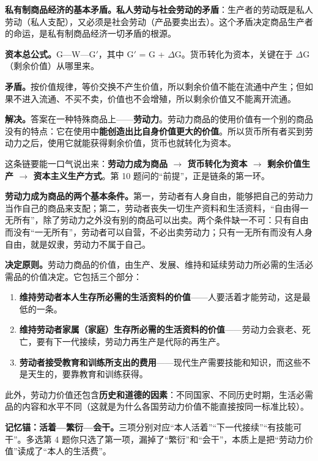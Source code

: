 \documentclass[11pt]{ctexart}
\newcommand{\dw}[1]{\textbf{\color{violetdeep}#1}}   %
\let\origsubhdr\subhdr
\renewcommand{\subhdr}[1]{\par\needspace{4\baselineskip}\origsubhdr{#1}}
\begin{document}
\textbf{私有制商品经济的基本矛盾。}\dw{私人劳动与社会劳动的矛盾}：生产者的劳动既是私人劳动（私人支配），又必须是社会劳动（产品要卖出去）。这个矛盾决定商品生产者的命运，是私有制商品经济一切矛盾的根源。


\textbf{资本总公式。}G—W—G$'$，其中 G$'$ = G + $\Delta$G。货币转化为资本，关键在于 $\Delta$G（剩余价值）从哪里来。

\textbf{矛盾。}按价值规律，等价交换不产生价值，所以剩余价值不能在流通中产生；但如果不进入流通、不买不卖，价值也不会增殖，所以剩余价值又不能离开流通。

\textbf{解决。}答案在一种特殊商品上——\dw{劳动力}。劳动力商品的使用价值有一个别的商品没有的特点：它在使用中\dw{能创造出比自身价值更大的价值}。所以货币所有者买到劳动力之后，使用它就能获得剩余价值，货币也就转化为资本。

这条链要能一口气说出来：\dw{劳动力成为商品 $\rightarrow$ 货币转化为资本 $\rightarrow$ 剩余价值生产 $\rightarrow$ 资本主义生产方式}。第 10 题问的“前提”，正是链条的第一环。

\textbf{劳动力成为商品的两个基本条件。}第一，劳动者有人身自由，能够把自己的劳动力当作自己的商品来支配；第二，劳动者丧失一切生产资料和生活资料，“自由得一无所有”，除了劳动力之外没有别的商品可以出卖。两个条件缺一不可：只有自由而没有“一无所有”，劳动者可以自营，不必出卖劳动力；只有一无所有而没有人身自由，就是奴隶，劳动力不属于自己。


\textbf{决定原则。}劳动力商品的价值，由生产、发展、维持和延续劳动力所必需的生活必需品的价值决定。它包括三个部分：

\begin{enumerate}[label=（\arabic*）,leftmargin=2.4em]
\item \dw{维持劳动者本人生存所必需的生活资料的价值}——人要活着才能劳动，这是最低的一条。
\item \dw{维持劳动者家属（家庭）生存所必需的生活资料的价值}——劳动力会衰老、死亡，要有下一代接续，劳动力再生产是代际的再生产。
\item \dw{劳动者接受教育和训练所支出的费用}——现代生产需要技能和知识，而这些不是天生的，要靠教育和训练获得。
\end{enumerate}

此外，劳动力价值还包含\dw{历史和道德的因素}：不同国家、不同历史时期，生活必需品的内容和水平不同（这就是为什么各国劳动力价值不能直接按同一标准比较）。

\textbf{记忆锚：活着—繁衍—会干。}三项分别对应“本人活着”“下一代接续”“有技能可干”。多选第 4 题你只选了第一项，漏掉了“繁衍”和“会干”，本质上是把“劳动力价值”读成了“本人的生活费”。
\end{document}
